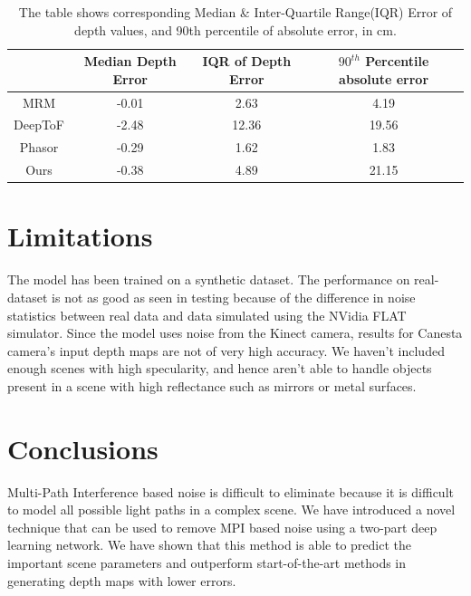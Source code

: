 \documentclass[runningheads]{llncs}
\begin{document}
    \begin{table}
    \centering
    \begin{tabular}{|c|c|c|c|}
    \hline
     & Median Depth Error & IQR of Depth Error & $90^{th}$ Percentile absolute error \\ \hline
    MRM & -0.01 & 2.63 & 4.19 \\ \hline
    DeepToF & -2.48 & 12.36 & 19.56 \\ \hline
    Phasor & -0.29 & 1.62 & 1.83 \\ \hline
        Ours & -0.38 & 4.89 & 21.15 \\ \hline
    
    \end{tabular}
    \caption{The table shows corresponding Median \& Inter-Quartile Range(IQR) Error of depth values, and 90th percentile of absolute error, in cm.}
    \label{tab:my-table}
\end{table}




\section{Limitations}

The model has been trained on a synthetic dataset. The performance on real-dataset is not as good as seen in testing because of the difference in noise statistics between real data and data simulated using the NVidia FLAT simulator. Since the model uses noise from the Kinect camera, results for Canesta camera's input depth maps are not of very high accuracy. 
\newline
\newline
We haven't included enough scenes with high specularity, and hence aren't able to handle objects present in a scene with high reflectance such as mirrors or metal surfaces. 


\section{Conclusions}


Multi-Path Interference based noise is difficult to eliminate because it is difficult to model all possible light paths in a complex scene. We have introduced a novel technique that can be used to remove MPI based noise using a two-part deep learning network. We have shown that this method is able to predict the important scene parameters and outperform start-of-the-art methods in generating depth maps with lower errors. 
\end{document}
